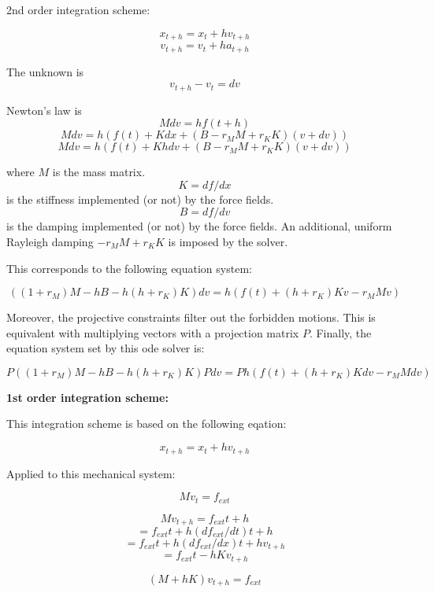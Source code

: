 \documentclass[9pt]{article}
\begin{document}
2nd order integration scheme:
 
    $$x_{t+h} = x_t + h v_{t+h}$$
    $$v_{t+h} = v_t + h a_{t+h}$$
 
    The unknown is
    $$v_{t+h} - v_t = dv$$
 
    Newton's law is
    $$ M dv = h f(t+h) $$
    $$ M dv = h ( f(t) + K dx     + (B - r_M M + r_K K) (v+dv) )$$
    $$ M dv = h ( f(t) + K h dv   + (B - r_M M + r_K K) (v+dv) )$$
 
    where $M$ is the mass matrix.
    $$ K = df/dx $$ is the stiffness implemented (or not) by the force fields.
    $$ B = df/dv $$ is the damping implemented (or not) by the force fields.
    An additional, uniform Rayleigh damping  $-r_M M + r_K K$ is imposed by the solver.
 
  This corresponds to the following equation system:
 
    $$ ( (1+r_M) M - h B - h(h + r_K) K ) dv = h ( f(t) + (h+r_K) K v - r_M M v )$$
 
  Moreover, the projective constraints filter out the forbidden motions.
  This is equivalent with multiplying vectors with a projection matrix $P$.
  Finally, the equation system set by this ode solver is:
 
    $$ P ( (1+r_M) M - h B - h(h + r_K) K ) P dv = P h ( f(t) + (h + r_K) K dv - r_M M dv )$$
 
{\bf 1st order integration scheme: }
 
  This integration scheme is based on the following eqation:
 
    $$x_{t+h} = x_t + h v_{t+h}$$
 
  Applied to this mechanical system:
 
    $$ M v_t = f_{ext} $$
 
    $$ M v_{t+h} = f_{ext}{t+h} $$
    $$           = f_{ext}{t} + h (df_{ext}/dt){t+h} $$
    $$           = f_{ext}{t} + h (df_{ext}/dx){t+h} v_{t+h} $$
    $$           = f_{ext}{t} - h K v_{t+h} $$
 
    $$ ( M + h K ) v_{t+h} = f_{ext} $$
 
 
\end{document}
